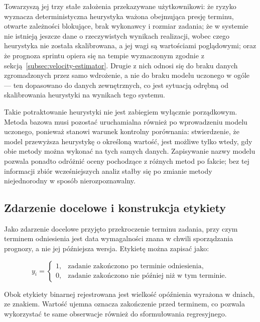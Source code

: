 Towarzyszą jej trzy stałe założenia przekazywane użytkownikowi: że ryzyko wyznacza deterministyczna heurystyka ważona obejmująca presję terminu, otwarte zależności blokujące, brak wykonawcy i rozmiar zadania; że w systemie nie istnieją jeszcze dane o rzeczywistych wynikach realizacji, wobec czego heurystyka nie została skalibrowana, a jej wagi są wartościami poglądowymi; oraz że prognoza sprintu opiera się na tempie wyznaczonym zgodnie z sekcją~\ref{subsec:velocity-estimator}. Drugie z nich odnosi się do braku danych zgromadzonych przez samo wdrożenie, a nie do braku modelu uczonego w ogóle — ten dopasowano do danych zewnętrznych, co jest sytuacją odrębną od skalibrowania heurystyki na wynikach tego systemu.

Takie potraktowanie heurystyki nie jest zabiegiem wyłącznie porządkowym. Metoda bazowa musi pozostać uruchamialna również po wprowadzeniu modelu uczonego, ponieważ stanowi warunek kontrolny porównania: stwierdzenie, że model przewyższa heurystykę o określoną wartość, jest możliwe tylko wtedy, gdy obie metody można wykonać na tych samych danych. Zapisywanie nazwy modelu pozwala ponadto odróżnić oceny pochodzące z różnych metod po fakcie; bez tej informacji zbiór wcześniejszych analiz stałby się po zmianie metody niejednorodny w sposób nierozpoznawalny.

\subsection{Zdarzenie docelowe i konstrukcja etykiety}

Jako zdarzenie docelowe przyjęto przekroczenie terminu zadania, przy czym terminem odniesienia jest data wymagalności znana w chwili sporządzania prognozy, a nie jej późniejsza wersja. Etykietę można zapisać jako:

\begin{equation}
    y_i =
    \begin{cases}
        1, & \text{zadanie zakończono po terminie odniesienia},\\
        0, & \text{zadanie zakończono nie później niż w tym terminie}.
    \end{cases}
    \label{eq:etykieta-opoznienia}
\end{equation}

Obok etykiety binarnej rejestrowana jest wielkość opóźnienia wyrażona w dniach, ze znakiem. Wartość ujemna oznacza zakończenie przed terminem, co pozwala wykorzystać te same obserwacje również do sformułowania regresyjnego.

